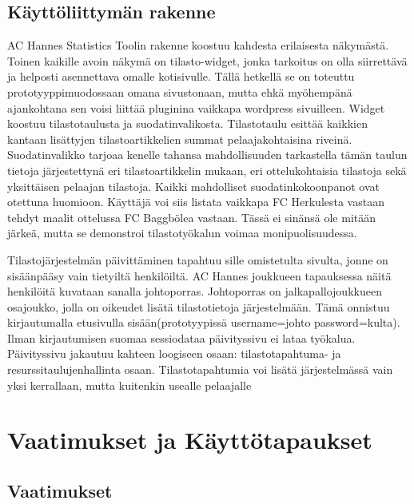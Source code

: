 \documentclass[12pt]{article} %
\begin{document}
\subsection{Käyttöliittymän rakenne} %
AC Hannes Statistics Toolin rakenne koostuu kahdesta erilaisesta näkymästä. Toinen kaikille avoin näkymä on tilasto-widget, jonka tarkoitus on olla siirrettävä ja helposti asennettava omalle kotisivulle. Tällä hetkellä se on toteuttu prototyyppimuodossaan omana sivustonaan, mutta ehkä myöhempänä ajankohtana sen voisi liittää pluginina vaikkapa wordpress sivuilleen. Widget koostuu tilastotaulusta ja suodatinvalikosta. Tilastotaulu esittää kaikkien kantaan lisättyjen tilastoartikkelien summat pelaajakohtaisina riveinä. Suodatinvalikko tarjoaa kenelle tahansa mahdollisuuden tarkastella tämän taulun tietoja järjestettynä eri tilastoartikkelin mukaan, eri ottelukohtaisia tilastoja sekä yksittäisen pelaajan tilastoja. Kaikki mahdolliset suodatinkokoonpanot ovat otettuna huomioon. Käyttäjä voi siis listata vaikkapa FC Herkulesta vastaan tehdyt maalit ottelussa FC Baggbölea vastaan. Tässä ei sinänsä ole mitään järkeä, mutta se demonstroi tilastotyökalun voimaa monipuolisuudessa.

Tilastojärjestelmän päivittäminen tapahtuu sille omistetulta sivulta, jonne on sisäänpääsy vain tietyiltä henkilöiltä. AC Hannes joukkueen tapauksessa näitä henkilöitä kuvataan sanalla johtoporras. Johtoporras on jalkapallojoukkueen osajoukko, jolla on oikeudet lisätä tilastotietoja järjestelmään. Tämä onnistuu kirjautumalla etusivulla sisään(prototyypissä username=johto password=kulta). Ilman kirjautumisen suomaa sessiodataa päivityssivu ei lataa työkalua. Päivityssivu jakautuu kahteen loogiseen osaan: tilastotapahtuma- ja resurssitaulujenhallinta osaan. Tilastotapahtumia voi lisätä järjestelmässä vain yksi kerrallaan, mutta kuitenkin usealle pelaajalle 


\section{Vaatimukset ja Käyttötapaukset} %



\subsection{Vaatimukset} %
\end{document}
